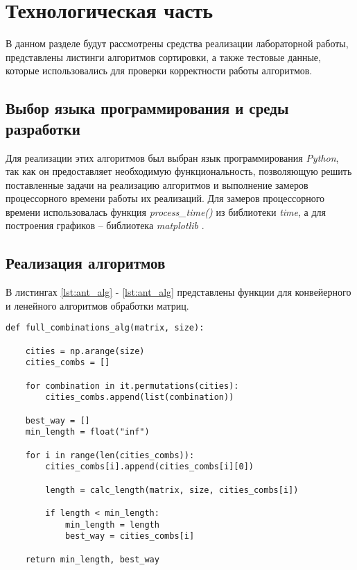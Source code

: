 \chapter{Технологическая часть}

В данном разделе будут рассмотрены средства реализации лабораторной работы, представлены листинги алгоритмов сортировки, а также тестовые данные, которые использовались для проверки корректности работы алгоритмов.

\section{Выбор языка программирования и среды разработки}
Для реализации этих алгоритмов был выбран язык программирования \textit{Python}, так как он предоставляет необходимую функциональность, позволяющую решить поставленные задачи на реализацию алгоритмов и выполнение замеров процессорного времени работы их реализаций.
Для замеров процессорного времени использовалась функция \textit{process\_time()} \cite{time} из библиотеки \textit{time}, а для построения графиков -- библиотека \textit{matplotlib} \cite{mpl}.

\section{Реализация алгоритмов}

В листингах \ref{lst:ant_alg} - \ref{lst:ant_alg} представлены функции для конвейерного и ленейного алгоритмов обработки матриц.

\begin{center}
\captionsetup{justification=raggedright,singlelinecheck=off}
\begin{lstlisting}[label=lst:full_combinations_alg,caption=Алгоритм полного перебора]
def full_combinations_alg(matrix, size):

	cities = np.arange(size)
	cities_combs = []

	for combination in it.permutations(cities):
		cities_combs.append(list(combination))

	best_way = []
	min_length = float("inf")

	for i in range(len(cities_combs)):
		cities_combs[i].append(cities_combs[i][0])

		length = calc_length(matrix, size, cities_combs[i])

		if length < min_length:
			min_length = length
			best_way = cities_combs[i]

	return min_length, best_way
\end{lstlisting}
\end{center}	


